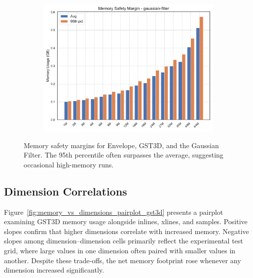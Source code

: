 \begin{figure}[htbp]
\begin{subfigure}[t]{0.49\textwidth}
    \end{subfigure}
    \hfill
    \begin{subfigure}[t]{0.49\textwidth}
        \centering
        \includegraphics[width=\textwidth]{assets/images/05/memory_safety_margin_gaussian-filter}
    \end{subfigure}
    \caption{Memory safety margins for Envelope, \ac{GST3D}, and the Gaussian Filter.
    The 95th percentile often surpasses the average, suggesting occasional high-memory runs.}
    \label{fig:memory_safety_margin}
\end{figure}

\subsection{Dimension Correlations}
\label{subsec:dimension-correlations}

Figure~\ref{fig:memory_vs_dimensions_pairplot_gst3d} presents a pairplot examining \ac{GST3D} memory usage alongside inlines, xlines, and samples.
Positive slopes confirm that higher dimensions correlate with increased memory.
Negative slopes among dimension--dimension cells primarily reflect the experimental test grid, where large values in one dimension often paired with smaller values in another.
Despite these trade-offs, the net memory footprint rose whenever any dimension increased significantly.

